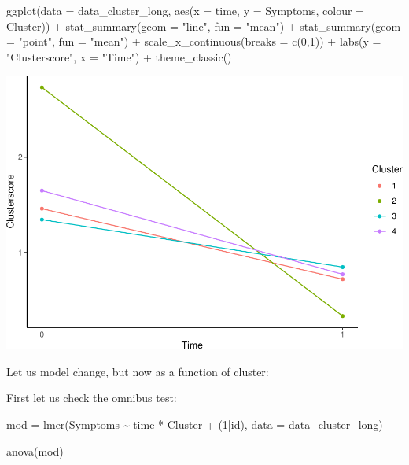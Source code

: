 \documentclass[
]{book}
\newenvironment{Shaded}{\begin{snugshade}}{\end{snugshade}}
\newcommand{\AttributeTok}[1]{\textcolor[rgb]{0.77,0.63,0.00}{#1}}
\newcommand{\DecValTok}[1]{\textcolor[rgb]{0.00,0.00,0.81}{#1}}
\newcommand{\FunctionTok}[1]{\textcolor[rgb]{0.00,0.00,0.00}{#1}}
\newcommand{\NormalTok}[1]{#1}
\newcommand{\OtherTok}[1]{\textcolor[rgb]{0.56,0.35,0.01}{#1}}
\newcommand{\SpecialCharTok}[1]{\textcolor[rgb]{0.00,0.00,0.00}{#1}}
\newcommand{\StringTok}[1]{\textcolor[rgb]{0.31,0.60,0.02}{#1}}
\begin{document}
\begin{Shaded}
\begin{Highlighting}[]
\FunctionTok{ggplot}\NormalTok{(}\AttributeTok{data =}\NormalTok{ data\_cluster\_long, }\FunctionTok{aes}\NormalTok{(}\AttributeTok{x =}\NormalTok{ time, }\AttributeTok{y =}\NormalTok{ Symptoms, }\AttributeTok{colour =}\NormalTok{ Cluster)) }\SpecialCharTok{+}
  \FunctionTok{stat\_summary}\NormalTok{(}\AttributeTok{geom =} \StringTok{"line"}\NormalTok{, }\AttributeTok{fun =} \StringTok{"mean"}\NormalTok{) }\SpecialCharTok{+}
   \FunctionTok{stat\_summary}\NormalTok{(}\AttributeTok{geom =} \StringTok{"point"}\NormalTok{, }\AttributeTok{fun =} \StringTok{"mean"}\NormalTok{) }\SpecialCharTok{+}
  \FunctionTok{scale\_x\_continuous}\NormalTok{(}\AttributeTok{breaks =} \FunctionTok{c}\NormalTok{(}\DecValTok{0}\NormalTok{,}\DecValTok{1}\NormalTok{)) }\SpecialCharTok{+}
  \FunctionTok{labs}\NormalTok{(}\AttributeTok{y =} \StringTok{"Clusterscore"}\NormalTok{, }\AttributeTok{x =} \StringTok{"Time"}\NormalTok{) }\SpecialCharTok{+}
  \FunctionTok{theme\_classic}\NormalTok{()}
\end{Highlighting}
\end{Shaded}

\includegraphics{DZP_R_bookdown_files/figure-latex/unnamed-chunk-24-1.pdf}

Let us model change, but now as a function of cluster:

First let us check the omnibus test:

\begin{Shaded}
\begin{Highlighting}[]
\NormalTok{mod }\OtherTok{=} \FunctionTok{lmer}\NormalTok{(Symptoms }\SpecialCharTok{\textasciitilde{}}\NormalTok{ time }\SpecialCharTok{*}\NormalTok{ Cluster }\SpecialCharTok{+}\NormalTok{ (}\DecValTok{1}\SpecialCharTok{|}\NormalTok{id), }\AttributeTok{data =}\NormalTok{ data\_cluster\_long)}

\FunctionTok{anova}\NormalTok{(mod)}
\end{Highlighting}
\end{Shaded}
\end{document}
